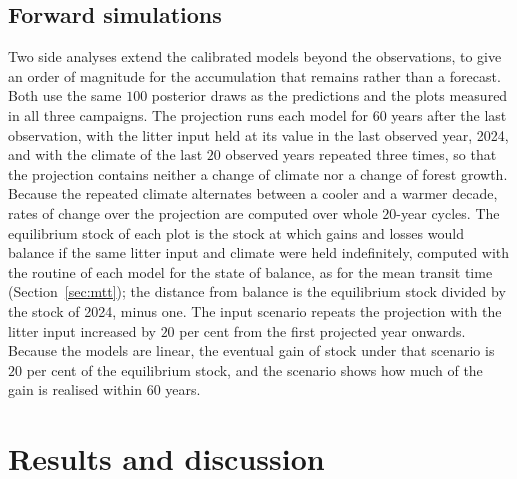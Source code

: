 \documentclass[11pt]{article}
\begin{document}
\subsection{Forward simulations}\label{sec:forward}

Two side analyses extend the calibrated models beyond the observations, to give an
order of magnitude for the accumulation that remains rather than a forecast. Both use
the same $100$ posterior draws as the predictions and the plots measured in all three
campaigns. The projection runs each model for $60$ years after the last observation,
with the litter input held at its value in the last observed year, 2024, and with the
climate of the last $20$ observed years repeated three times, so that the projection
contains neither a change of climate nor a change of forest growth. Because the
repeated climate alternates between a cooler and a warmer decade, rates of change over
the projection are computed over whole $20$-year cycles. The equilibrium stock of each
plot is the stock at which gains and losses would balance if the same litter input and
climate were held indefinitely, computed with the routine of each model for the state of
balance, as for the mean transit time (Section~\ref{sec:mtt}); the distance from balance
is the equilibrium stock divided by the stock of 2024, minus one. The input scenario
repeats the projection with the litter input increased by $20$ per cent from the first
projected year onwards. Because the models are linear, the eventual gain of stock under
that scenario is $20$ per cent of the equilibrium stock, and the scenario shows how much
of the gain is realised within $60$ years.

\section{Results and discussion}
\end{document}
